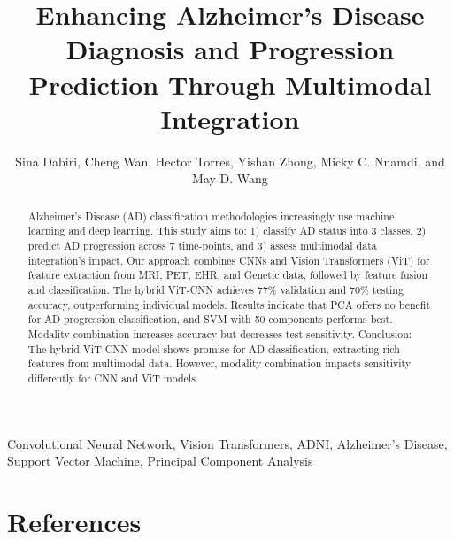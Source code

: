 \documentclass[journal,twoside,web]{ieeecolor}
\begin{document}
\title{Enhancing Alzheimer's Disease Diagnosis and Progression Prediction Through Multimodal Integration}
\author{ Sina Dabiri, Cheng Wan, Hector Torres, Yishan Zhong, Micky C. Nnamdi, and May D. Wang}

\maketitle

\begin{abstract}
Alzheimer’s Disease (AD) classification methodologies increasingly use machine learning and deep learning. This study aims to: 1) classify AD status into 3 classes, 2) predict AD progression across 7 time-points, and 3) assess multimodal data integration's impact. Our approach combines CNNs and Vision Transformers (ViT) for feature extraction from MRI, PET, EHR, and Genetic data, followed by feature fusion and classification. The hybrid ViT-CNN achieves 77\% validation and 70\% testing accuracy, outperforming individual models. Results indicate that PCA offers no benefit for AD progression classification, and SVM with 50 components performs best. Modality combination increases accuracy but decreases test sensitivity. Conclusion: The hybrid ViT-CNN model shows promise for AD classification, extracting rich features from multimodal data. However, modality combination impacts sensitivity differently for CNN and ViT models.
\end{abstract}

\begin{IEEEkeywords}
Convolutional Neural Network, Vision Transformers, ADNI, Alzheimer's Disease, Support Vector Machine, Principal Component Analysis\\
\end{IEEEkeywords}


\vspace{-3mm}

% 


\vspace{-3mm}


\vspace{-3mm}


\vspace{-3mm}


\vspace{-3mm}

\section{References}


\end{document}
